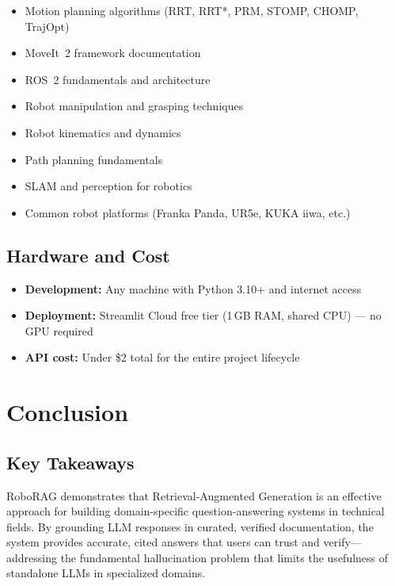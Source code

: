\documentclass[12pt, a4paper]{article}
\begin{document}
\begin{itemize}[nosep]
    \item Motion planning algorithms (RRT, RRT*, PRM, STOMP, CHOMP, TrajOpt)
    \item MoveIt~2 framework documentation
    \item ROS~2 fundamentals and architecture
    \item Robot manipulation and grasping techniques
    \item Robot kinematics and dynamics
    \item Path planning fundamentals
    \item SLAM and perception for robotics
    \item Common robot platforms (Franka Panda, UR5e, KUKA iiwa, etc.)
\end{itemize}

\subsection{Hardware and Cost}

\begin{itemize}[nosep]
    \item \textbf{Development:} Any machine with Python 3.10+ and internet access
    \item \textbf{Deployment:} Streamlit Cloud free tier (1\,GB RAM, shared CPU) --- no GPU required
    \item \textbf{API cost:} Under \$2 total for the entire project lifecycle
\end{itemize}


\section{Conclusion}

\subsection{Key Takeaways}

RoboRAG demonstrates that Retrieval-Augmented Generation is an effective approach for building domain-specific question-answering systems in technical fields. By grounding LLM responses in curated, verified documentation, the system provides accurate, cited answers that users can trust and verify---addressing the fundamental hallucination problem that limits the usefulness of standalone LLMs in specialized domains.
\end{document}
